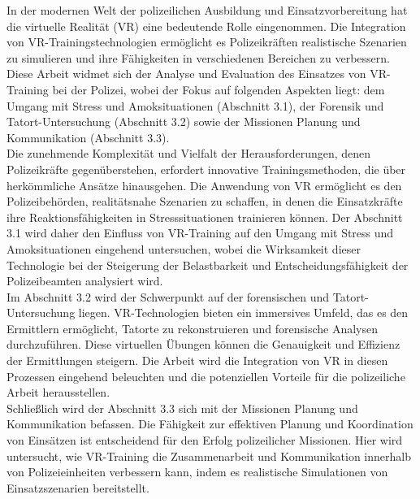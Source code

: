 In der modernen Welt der polizeilichen Ausbildung und Einsatzvorbereitung hat die virtuelle Realität (VR) eine bedeutende Rolle eingenommen. 
Die Integration von VR-Trainingstechnologien ermöglicht es  Polizeikräften realistische Szenarien zu simulieren und ihre Fähigkeiten in verschiedenen Bereichen zu verbessern. 
Diese Arbeit widmet sich der Analyse und Evaluation des Einsatzes von VR-Training bei der Polizei, wobei der Fokus auf folgenden Aspekten liegt: dem Umgang mit Stress und Amoksituationen (Abschnitt 3.1), 
der Forensik und Tatort-Untersuchung (Abschnitt 3.2) sowie der Missionen Planung und Kommunikation (Abschnitt 3.3).
\\
Die zunehmende Komplexität und Vielfalt der Herausforderungen, denen Polizeikräfte gegenüberstehen, erfordert innovative Trainingsmethoden, die über herkömmliche Ansätze hinausgehen.
Die Anwendung von VR ermöglicht es den Polizeibehörden, realitätsnahe Szenarien zu schaffen, in denen die Einsatzkräfte ihre Reaktionsfähigkeiten in Stresssituationen trainieren können. 
Der Abschnitt 3.1 wird daher den Einfluss von VR-Training auf den Umgang mit Stress und Amoksituationen eingehend untersuchen, 
wobei die Wirksamkeit dieser Technologie bei der Steigerung der Belastbarkeit und Entscheidungsfähigkeit der Polizeibeamten analysiert wird.
\\
Im Abschnitt 3.2 wird der Schwerpunkt auf der forensischen und Tatort-Untersuchung liegen. 
VR-Technologien bieten ein immersives Umfeld, das es den Ermittlern ermöglicht, Tatorte zu rekonstruieren und forensische Analysen durchzuführen. 
Diese virtuellen Übungen können die Genauigkeit und Effizienz der Ermittlungen steigern. 
Die Arbeit wird die Integration von VR in diesen Prozessen eingehend beleuchten und die potenziellen Vorteile für die polizeiliche Arbeit herausstellen.
\\
Schließlich wird der Abschnitt 3.3 sich mit der Missionen Planung und Kommunikation befassen.
Die Fähigkeit zur effektiven Planung und Koordination von Einsätzen ist entscheidend für den Erfolg polizeilicher Missionen. 
Hier wird untersucht, wie VR-Training die Zusammenarbeit und Kommunikation innerhalb von Polizeieinheiten verbessern kann, indem es realistische Simulationen von Einsatzszenarien bereitstellt. 
